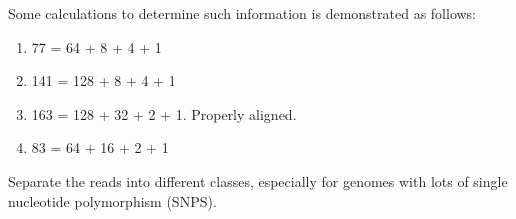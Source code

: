 Some calculations to determine such information is demonstrated as follows: \vspace{-0.3cm}
\begin{enumerate} \itemsep -4pt
\item 77 = 64 + 8 + 4 + 1
\item 141 = 128 + 8 + 4 + 1
\item 163 = 128 + 32 + 2 + 1. Properly aligned.
\item 83 = 64 + 16 + 2 + 1
\end{enumerate}

Separate the reads into different classes, especially for genomes with lots of single nucleotide polymorphism (SNPS).
















